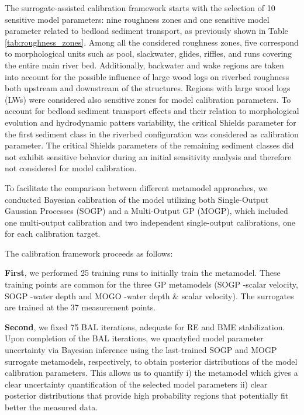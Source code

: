 \documentclass[draft,linenumbers,onecolumn]{agujournal2019} %
\begin{document}
The surrogate-assisted calibration framework starts with the selection of 10 sensitive model parameters: nine roughness zones and one sensitive model parameter related to bedload sediment transport, as previously shown in Table \ref{tab:roughness_zones}. Among all the considered roughness zones, five correspond to morphological units such as pool, slackwater, glides, riffles, and runs covering the entire main river bed. Additionally, backwater and wake regions are taken into account for the possible influence of large wood logs on riverbed roughness both upstream and downstream of the structures. Regions with large wood logs (LWs) were considered also sensitive zones for model calibration parameters. To account for bedload sediment transport effects and their relation to morphological evolution and hydrodynamic patters variability, the critical Shields parameter for the first sediment class in the riverbed configuration was considered as calibration parameter. The critical Shields parameters of the remaining sediment classes did not exhibit sensitive behavior during an initial sensitivity analysis and therefore not considered for model calibration. 

To facilitate the comparison between different metamodel approaches, we conducted Bayesian calibration of the model utilizing both Single-Output Gaussian Processes (SOGP) and a Multi-Output GP (MOGP), which included one multi-output calibration and two independent single-output calibrations, one for each calibration target.

The calibration framework proceeds as follows:

\textbf{First}, we performed 25 training runs to initially train the metamodel. These training points are common for the three GP metamodels (SOGP -scalar velocity, SOGP -water depth and MOGO -water depth \& scalar velocity). The surrogates are trained at the 37 measurement points.

\textbf{Second}, we fixed 75 BAL iterations, adequate for RE and BME stabilization. Upon completion of the BAL iterations, we quantyfied model parameter uncertainty via Bayesian inference using the last-trained SOGP and MOGP surrogate metamodels, respectively, to obtain posterior distributions of the model calibration parameters. This allows us to quantify i) the metamodel which gives a clear uncertainty quantification of the selected model parameters ii) clear posterior distributions that provide high probability regions that potentially fit better the measured data. 
\end{document}
